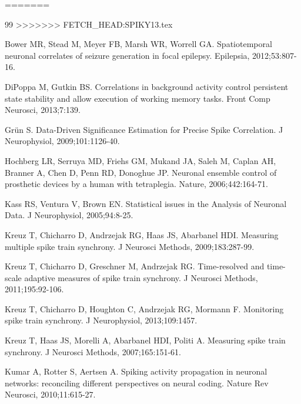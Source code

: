 \documentclass[10pt,twocolumn]{elsart5p}
\begin{document}
\begin{thebibliography}{25}
=======
\begin{thebibliography} {99}
>>>>>>> FETCH_HEAD:SPIKY13.tex

Bower MR, Stead M, Meyer FB, Marsh WR, Worrell GA. Spatiotemporal neuronal correlates of seizure generation in focal epilepsy. Epilepsia, 2012;53:807-16.

{DiPoppa} M, Gutkin BS. Correlations in background activity control persistent state stability and allow execution of working memory tasks. Front Comp Neurosci, 2013;7:139.

Gr{\"u}n S. Data-Driven Significance Estimation for Precise Spike Correlation. J Neurophysiol, 2009;101:1126-40.

Hochberg LR, Serruya MD, Friehs GM, Mukand JA, Saleh M, Caplan AH, Branner A, Chen D, Penn RD, Donoghue JP. Neuronal ensemble control of prosthetic devices by a human with tetraplegia. Nature, 2006;442:164-71.

Kass RS, Ventura V, Brown EN. Statistical issues in the Analysis of Neuronal Data. J Neurophysiol, 2005;94:8-25.

Kreuz T, Chicharro D, Andrzejak RG, Haas JS, Abarbanel HDI.
  Measuring multiple spike train synchrony. J Neurosci Methods, 2009;183:287-99.

Kreuz T, Chicharro D, Greschner M, Andrzejak RG.
  Time-resolved and time-scale adaptive measures of spike train synchrony. J Neurosci Methods, 2011;195:92-106.


Kreuz T, Chicharro D, Houghton C, Andrzejak RG, Mormann F.
  Monitoring spike train synchrony. J Neurophysiol, 2013;109:1457.

Kreuz T, Haas JS, Morelli A, Abarbanel HDI, Politi A.
  Measuring spike train synchrony. J Neurosci Methods, 2007;165:151-61.

Kumar A, Rotter S, Aertsen A. Spiking activity propagation in neuronal networks: reconciling different perspectives on neural coding. Nature Rev Neurosci, 2010;11:615-27.


\end{thebibliography}
\end{thebibliography}
\end{document}
